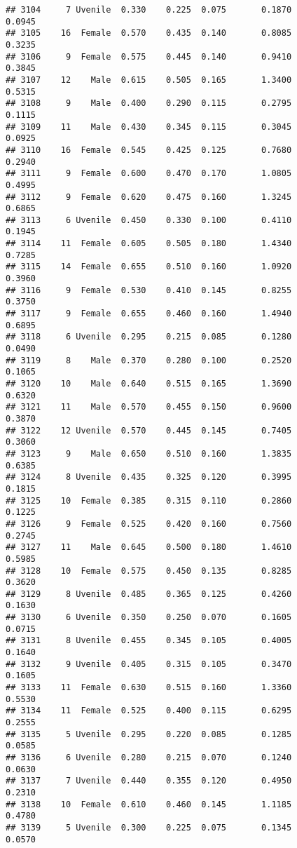 \documentclass[
]{article}
\begin{document}
\begin{verbatim}
## 3104     7 Uvenile  0.330    0.225  0.075       0.1870         0.0945
## 3105    16  Female  0.570    0.435  0.140       0.8085         0.3235
## 3106     9  Female  0.575    0.445  0.140       0.9410         0.3845
## 3107    12    Male  0.615    0.505  0.165       1.3400         0.5315
## 3108     9    Male  0.400    0.290  0.115       0.2795         0.1115
## 3109    11    Male  0.430    0.345  0.115       0.3045         0.0925
## 3110    16  Female  0.545    0.425  0.125       0.7680         0.2940
## 3111     9  Female  0.600    0.470  0.170       1.0805         0.4995
## 3112     9  Female  0.620    0.475  0.160       1.3245         0.6865
## 3113     6 Uvenile  0.450    0.330  0.100       0.4110         0.1945
## 3114    11  Female  0.605    0.505  0.180       1.4340         0.7285
## 3115    14  Female  0.655    0.510  0.160       1.0920         0.3960
## 3116     9  Female  0.530    0.410  0.145       0.8255         0.3750
## 3117     9  Female  0.655    0.460  0.160       1.4940         0.6895
## 3118     6 Uvenile  0.295    0.215  0.085       0.1280         0.0490
## 3119     8    Male  0.370    0.280  0.100       0.2520         0.1065
## 3120    10    Male  0.640    0.515  0.165       1.3690         0.6320
## 3121    11    Male  0.570    0.455  0.150       0.9600         0.3870
## 3122    12 Uvenile  0.570    0.445  0.145       0.7405         0.3060
## 3123     9    Male  0.650    0.510  0.160       1.3835         0.6385
## 3124     8 Uvenile  0.435    0.325  0.120       0.3995         0.1815
## 3125    10  Female  0.385    0.315  0.110       0.2860         0.1225
## 3126     9  Female  0.525    0.420  0.160       0.7560         0.2745
## 3127    11    Male  0.645    0.500  0.180       1.4610         0.5985
## 3128    10  Female  0.575    0.450  0.135       0.8285         0.3620
## 3129     8 Uvenile  0.485    0.365  0.125       0.4260         0.1630
## 3130     6 Uvenile  0.350    0.250  0.070       0.1605         0.0715
## 3131     8 Uvenile  0.455    0.345  0.105       0.4005         0.1640
## 3132     9 Uvenile  0.405    0.315  0.105       0.3470         0.1605
## 3133    11  Female  0.630    0.515  0.160       1.3360         0.5530
## 3134    11  Female  0.525    0.400  0.115       0.6295         0.2555
## 3135     5 Uvenile  0.295    0.220  0.085       0.1285         0.0585
## 3136     6 Uvenile  0.280    0.215  0.070       0.1240         0.0630
## 3137     7 Uvenile  0.440    0.355  0.120       0.4950         0.2310
## 3138    10  Female  0.610    0.460  0.145       1.1185         0.4780
## 3139     5 Uvenile  0.300    0.225  0.075       0.1345         0.0570

\end{verbatim}
\end{document}
